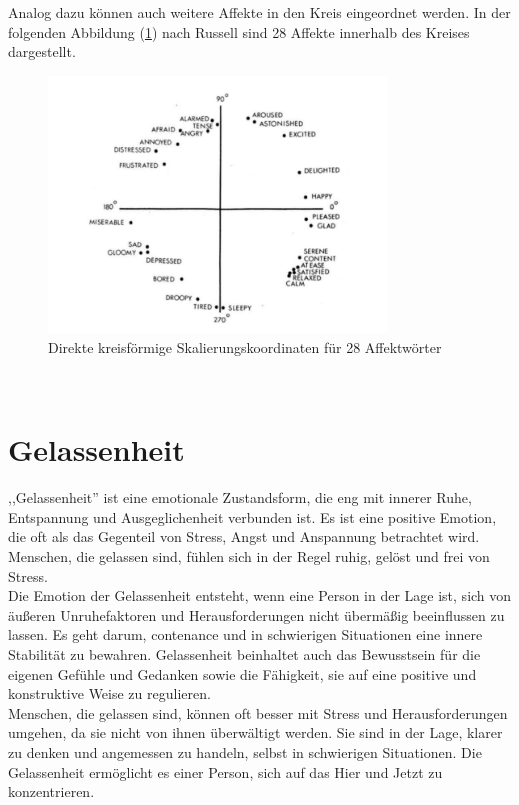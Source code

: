 \documentclass[./dokumentation.tex]{subfiles}
\begin{document}
Analog dazu können auch weitere Affekte in den Kreis eingeordnet werden. In der folgenden Abbildung (\ref{fig5:28affect}) nach Russell sind 28 Affekte innerhalb des Kreises dargestellt.

\begin{figure}[H]
    \centering
    \includegraphics[width=0.8\textwidth]{bilder/russell2.png}
    \caption{Direkte kreisförmige Skalierungskoordinaten für 28 Affektwörter \cite{Russell1980}}
    \label{fig5:28affect}
\end{figure}\\

\section{Gelassenheit}
,,Gelassenheit'' ist eine emotionale Zustandsform, die eng mit innerer Ruhe, Entspannung und Ausgeglichenheit verbunden ist. Es ist eine positive Emotion, die oft als das Gegenteil von Stress, Angst und Anspannung betrachtet wird. Menschen, die gelassen sind, fühlen sich in der Regel ruhig, gelöst und frei von Stress. \\
Die Emotion der Gelassenheit entsteht, wenn eine Person in der Lage ist, sich von äußeren Unruhefaktoren und Herausforderungen nicht übermäßig beeinflussen zu lassen. Es geht darum, contenance und in schwierigen Situationen eine innere Stabilität zu bewahren. Gelassenheit beinhaltet auch das Bewusstsein für die eigenen Gefühle und Gedanken sowie die Fähigkeit, sie auf eine positive und konstruktive Weise zu regulieren. \\
Menschen, die gelassen sind, können oft besser mit Stress und Herausforderungen umgehen, da sie nicht von ihnen überwältigt werden. Sie sind in der Lage, klarer zu denken und angemessen zu handeln, selbst in schwierigen Situationen. Die Gelassenheit ermöglicht es einer Person, sich auf das Hier und Jetzt zu konzentrieren.\\
\end{document}
